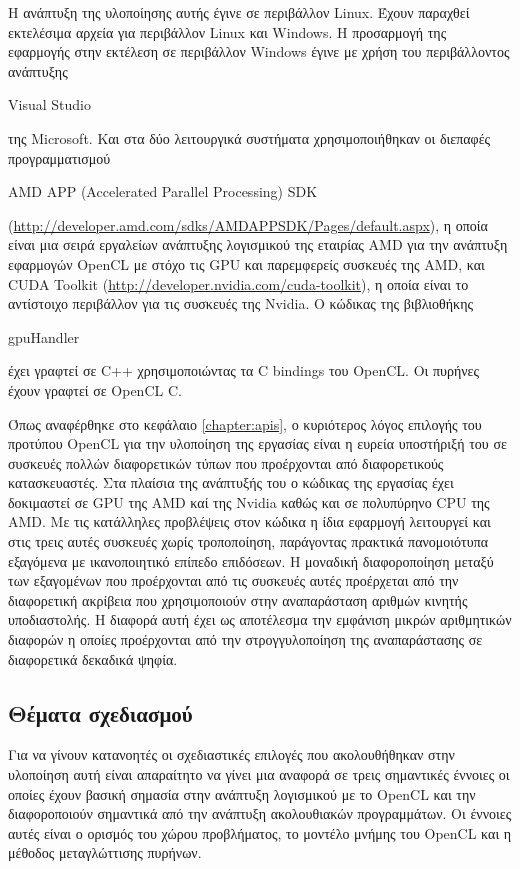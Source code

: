 Η ανάπτυξη της υλοποίησης αυτής έγινε σε περιβάλλον Linux. Έχουν παραχθεί εκτελέσιμα αρχεία για περιβάλλον Linux και Windows. Η προσαρμογή της εφαρμογής στην εκτέλεση σε περιβάλλον Windows έγινε με χρήση του περιβάλλοντος ανάπτυξης \begin{english}Visual Studio\end{english} της Μicrosoft. Και στα δύο λειτουργικά συστήματα χρησιμοποιήθηκαν οι διεπαφές προγραμματισμού \begin{english}AMD APP (Accelerated Parallel Processing) SDK\end{english} (\url{http://developer.amd.com/sdks/AMDAPPSDK/Pages/default.aspx}), η οποία είναι μια σειρά εργαλείων ανάπτυξης λογισμικού της εταιρίας AMD για την ανάπτυξη εφαρμογών OpenCL με στόχο τις GPU και παρεμφερείς συσκευές της AMD, και CUDA Toolkit (\url{http://developer.nvidia.com/cuda-toolkit}), η οποία είναι το αντίστοιχο περιβάλλον για τις συσκευές της Nvidia. Ο κώδικας της βιβλιοθήκης \begin{english}gpuHandler\end{english} έχει γραφτεί σε C++ χρησιμοποιώντας τα C bindings του ΟpenCL. Οι πυρήνες έχουν γραφτεί σε OpenCL C. 

Όπως αναφέρθηκε στο κεφάλαιο \ref{chapter:apis}, ο κυριότερος λόγος επιλογής του προτύπου OpenCL για την υλοποίηση της εργασίας είναι η ευρεία υποστήριξή του σε συσκευές πολλών διαφορετικών τύπων που προέρχονται από  διαφορετικούς κατασκευαστές. Στα πλαίσια της ανάπτυξής του ο κώδικας της εργασίας έχει δοκιμαστεί σε GPU της AMD καί της Nvidia καθώς και σε πολυπύρηνο CPU της AMD. Με τις κατάλληλες προβλέψεις στον κώδικα η ίδια εφαρμογή λειτουργεί και στις τρεις αυτές συσκευές χωρίς τροποποίηση, παράγοντας πρακτικά πανομοιότυπα εξαγόμενα με ικανοποιητικό επίπεδο επιδόσεων. Η μοναδική διαφοροποίηση μεταξύ των εξαγομένων που προέρχονται από τις συσκευές αυτές προέρχεται από την διαφορετική ακρίβεια που χρησιμοποιούν στην αναπαράσταση αριθμών κινητής υποδιαστολής. Η διαφορά αυτή έχει ως αποτέλεσμα την εμφάνιση μικρών αριθμητικών διαφορών η οποίες προέρχονται από την στρογγυλοποίηση της αναπαράστασης σε διαφορετικά δεκαδικά ψηφία.

\subsection{Θέματα σχεδιασμού}
\label{chapter:design}

\noindent Για να γίνουν κατανοητές οι σχεδιαστικές επιλογές που ακολουθήθηκαν στην υλοποίηση αυτή είναι απαραίτητο να γίνει μια αναφορά σε τρεις σημαντικές έννοιες οι οποίες έχουν βασική σημασία στην ανάπτυξη λογισμικού με το OpenCL και την διαφοροποιούν σημαντικά από την ανάπτυξη ακολουθιακών προγραμμάτων. Οι έννοιες αυτές είναι ο ορισμός του χώρου προβλήματος, το μοντέλο μνήμης του OpenCL και η μέθοδος μεταγλώττισης πυρήνων.

